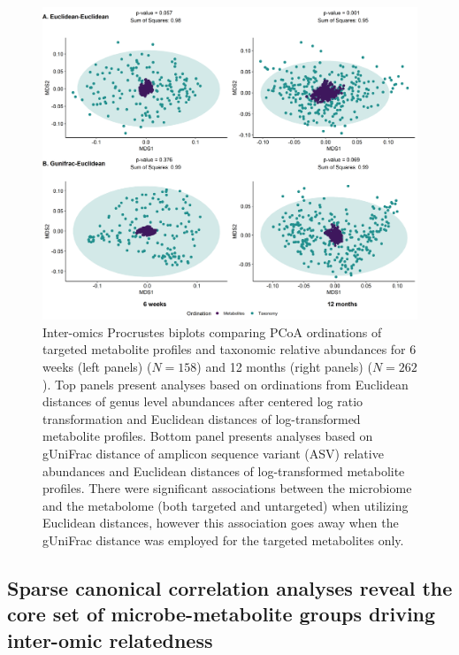 \begin{figure}[!h]
    \centering
    \includegraphics[width=\linewidth]{figures/ch2_f2.png}
    \caption[Inter-omics Procrustes biplots comparing PCoA ordinations of targeted metabolite profiles and taxonomic relative abundances for 6 weeks (left panels) ($N = 158$) and 12 months (right panels) ($N = 262$)]{Inter-omics Procrustes biplots comparing PCoA ordinations of targeted metabolite profiles and taxonomic relative abundances for 6 weeks (left panels) ($N = 158$) and 12 months (right panels) ($N = 262$). Top panels present analyses based on ordinations from Euclidean distances of genus level abundances after centered log ratio transformation and Euclidean distances of log-transformed metabolite profiles. Bottom panel presents analyses based on gUniFrac distance of amplicon sequence variant (ASV) relative abundances and Euclidean distances of log-transformed metabolite profiles. There were significant associations between the microbiome and the metabolome (both targeted and untargeted) when utilizing Euclidean distances, however this association goes away when the gUniFrac distance was employed for the targeted metabolites only.}
    \label{fig:2.2}
\end{figure}

\subsection{Sparse canonical correlation analyses reveal the core set of microbe-metabolite groups driving inter-omic relatedness}

